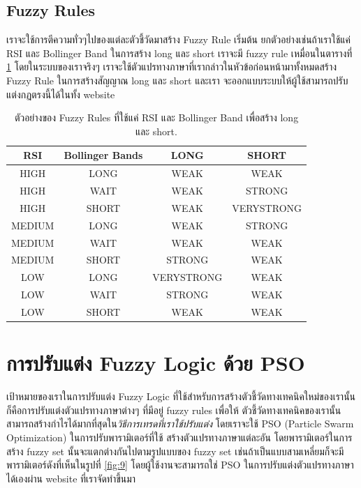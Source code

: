 \subsection{Fuzzy Rules}
เราจะใช้การตีความทั่วๆไปของแต่ละตัวชี้วัดมาสร้าง Fuzzy Rule เริ่มต้น ยกตัวอย่างเช่นถ้าเราใช้แค่ RSI และ Bollinger Band ในการสร้าง long และ short เราจะมี fuzzy rule
เหมื่อนในตารางที่ \ref{table:1} โดยในระบบของเราจริงๆ เราจะใช้ตัวแปรทางภาษาที่เรากล่าวในหัวข้อก่อนหน้ามาทั้งหมดสร้าง Fuzzy Rule ในการสร้างสัญญาณ long และ short และเรา
จะออกแบบระบบให้ผู้ใช้สามารถปรับแต่งกฏตรงนี้ได้ในทั้ง website

\begin{table}[htp]
    \centering
    \begin{tabular}{c c c c}
        \toprule
        {RSI}  & {Bollinger Bands} & {LONG}     & {SHORT}    \\
        \midrule
        HIGH   & LONG              & WEAK       & WEAK       \\
        HIGH   & WAIT              & WEAK       & STRONG     \\
        HIGH   & SHORT             & WEAK       & VERYSTRONG \\
        MEDIUM & LONG              & WEAK       & STRONG     \\
        MEDIUM & WAIT              & WEAK       & WEAK       \\
        MEDIUM & SHORT             & STRONG     & WEAK       \\
        LOW    & LONG              & VERYSTRONG & WEAK       \\
        LOW    & WAIT              & STRONG     & WEAK       \\
        LOW    & SHORT             & WEAK       & WEAK       \\
        \bottomrule
    \end{tabular}
    \caption{ตัวอย่างของ Fuzzy Rules ที่ใช้แค่ RSI และ Bollinger Band เพื่อสร้าง long และ short.}
    \label{table:1}
\end{table}
\FloatBarrier

\section{การปรับแต่ง Fuzzy Logic ด้วย PSO}
เป้าหมายของเราในการปรับแต่ง Fuzzy Logic ที่ใช้สำหรับการสร้างตัวชี้วัดทางเทคนิคใหม่ของเรานั้น ก็คือการปรับแต่งตัวแปรทางภาษาต่างๆ ที่มีอยู่ fuzzy rules เพื่อให้
ตัวชี้วัดทางเทคนิคของเรานั้นสามารถสร้างกำไรได้มากที่สุดใน\emph{วิธีการเทรดที่เราใช้ปรับแต่ง} โดยเราจะใช้ PSO (Particle Swarm Optimization) ในการปรับพารามิเตอร์ที่ใช้
สร้างตัวแปรทางภาษาแต่ละอัน โดยพารามิเตอร์ในการสร้าง fuzzy set นั้นจะแตกต่างกันไปตามรูปแบบของ fuzzy set
เช่นถ้าเป็นแบบสามเหลี่ยมก็จะมีพารามิเตอร์ดังที่เห็นในรูปที่ \ref{fig:9} โดยผู้ใช้งานจะสามารถใช่ PSO ในการปรับแต่งตัวแปรทางภาษาได้เองผ่าน website ที่เราจัดทำขึ้นมา

